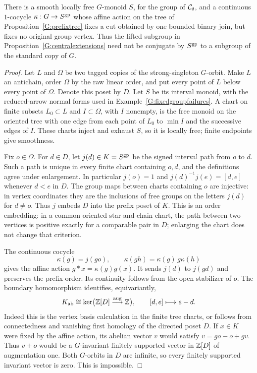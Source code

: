 \begin{example}
\label{G:affinecutcounterexample}
There is a smooth locally free $G$-monoid $S$, for the group of
$\mathcal C_\delta$, and a continuous $1$-cocycle $\kappa:G\to S^{\mathrm{gp}}$
whose affine action on the tree of Proposition~\ref{G:prefixtree}
fixes a cut obtained by one bounded binary join, but fixes no
original group vertex. Thus the lifted subgroup in
Proposition~\ref{G:centralextensions} need not be conjugate by
$S^{\mathrm{gp}}$ to a subgroup of the standard copy of $G$.
\end{example}
\begin{proof}
Let $L$ and $\Omega$ be two tagged copies of the strong-singleton
$G$-orbit. Make $L$ an antichain, order $\Omega$ by the raw
linear order, and put every point of $L$ below every point of
$\Omega$. Denote this poset by $D$. Let $S$ be its interval
monoid, with the reduced-arrow normal forms used in
Example~\ref{G:fixedgroupfailures}. A chart on finite subsets
$L_0\subset L$ and $I\subset\Omega$, with $I$ nonempty, is the
free monoid on the oriented tree with one edge from each point
of $L_0$ to $\min I$ and the successive edges of $I$.
These charts inject and exhaust $S$, so it is locally free;
finite endpoints give smoothness.

Fix $o\in\Omega$. For $d\in D$, let $j(d)\in K=S^{\mathrm{gp}}$ be
the signed interval path from $o$ to $d$. Such a path is unique
in every finite chart containing $o,d$, and the definitions
agree under enlargement. In particular $j(o)=1$ and
$j(d)^{-1}j(e)=[d,e]$ whenever $d<e$ in $D$.
The group maps between charts containing $o$ are injective:
in vertex coordinates they are the inclusions of free groups
on the letters $j(d)$ for $d\ne o$. Thus $j$ embeds $D$ into
the prefix poset of $K$. This is an order embedding: in a
common oriented star-and-chain chart, the path between two
vertices is positive exactly for a comparable pair in $D$;
enlarging the chart does not change that criterion.

The continuous cocycle
\[
 \kappa(g)=j(go),\qquad
 \kappa(gh)=\kappa(g)\,g\kappa(h)
\]
gives the affine action $g*x=\kappa(g)g(x)$. It sends
$j(d)$ to $j(gd)$ and preserves the prefix order. Its
continuity follows from the open stabilizer of $o$.
The boundary homomorphism identifies, equivariantly,
\[
 K_{\mathrm{ab}}\cong\ker\bigl(\mathbb Z[D]\stackrel{\operatorname{aug}}{\longrightarrow}\mathbb Z\bigr),
 \qquad [d,e]\longmapsto e-d.
\]
Indeed this is the vertex basis calculation in the finite tree
charts, or follows from connectedness and vanishing first
homology of the directed poset $D$.
If $x\in K$ were fixed by the affine action, its abelian vector
$v$ would satisfy $v=go-o+gv$. Thus $v+o$ would be a
$G$-invariant finitely supported vector in $\mathbb Z[D]$ of augmentation
one. Both $G$-orbits in $D$ are infinite, so every finitely
supported invariant vector is zero. This is impossible.


\end{proof}
